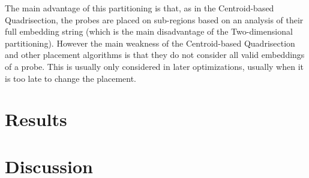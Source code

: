 \documentclass{llncs}
\newcommand{\ignore}[1]{}
\begin{document}
{The main advantage of this partitioning is that, as in the Centroid-based Quadrisection, the probes are placed on sub-regions based on an analysis of their full embedding string (which is the main disadvantage of the Two-dimensional partitioning). However the main weakness of the Centroid-based Quadrisection and other placement algorithms is that they do not consider all valid embeddings of a probe. This is usually only considered in later optimizations, usually when it is too late to change the placement.
}

\section{Results}
\label{sec:results}

\ignore{Their results show that the running time of the row-epitaxial algorithm
drops significantly with increasing recursion depth. The time required to place
the probes of a 500\,x\,500 chip, for instance, dropped by 69\% with $L = 3$ when
compared with the time required by the row-epitaxial without any partitioning.

It is not clear from their experiments, however, how the choice of $L$ impaired
the performance of the row-epitaxial algorithm in terms of solution quality since
they have restricted their experiments to $L \leq 3$. Moreover, there is no clear
trend toward reduction or increase in border length as $L$ varies from~0 to~3.}


\section{Discussion}
\label{sec:discuss}
\end{document}
